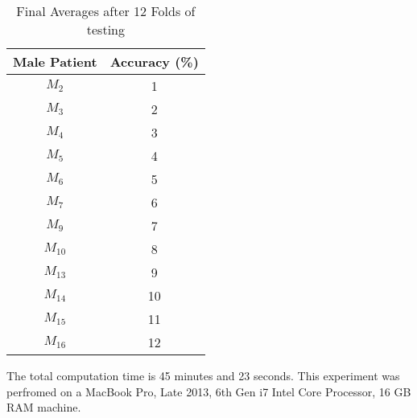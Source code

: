 \begin{table}[h!]
\centering
\begin{tabular}{||c c||} 
\hline
Male Patient & Accuracy (\%)  \\ [0.5ex] 
\hline \hline
$M_2$ & 1  \\ 
\hline
$M_3$ & 2  \\ 
\hline
$M_4$ & 3  \\ 
\hline
$M_5$ & 4  \\ 
\hline
$M_6$ & 5  \\ 
\hline
$M_7$ & 6  \\ 
\hline
$M_9$ & 7  \\ 
\hline
$M_{10}$ & 8  \\ 
\hline
$M_{13}$ & 9  \\ 
\hline
$M_{14}$ & 10  \\ 
\hline
$M_{15}$ & 11  \\ 
\hline 
$M_{16}$ & 12  \\ 
\hline 
\hline
\end{tabular}
\caption{Final Averages after 12 Folds of testing}
\label{table:results}
\end{table}

The total computation time is 45 minutes and 23 seconds. This experiment was 
perfromed on a MacBook Pro, Late 2013, 6th Gen i7 Intel Core Processor, 16 GB 
RAM machine.